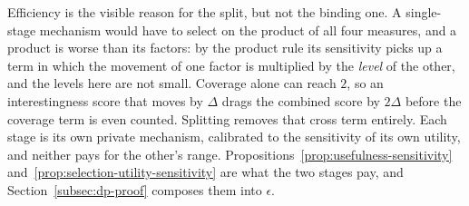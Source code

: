 Efficiency is the visible reason for the split, but not the binding one.
A single-stage mechanism would have to select on the product of all four measures, and a product is worse than its factors: by the product rule its sensitivity picks up a term in which the movement of one factor is multiplied by the \emph{level} of the other, and the levels here are not small.
Coverage alone can reach $2$, so an interestingness score that moves by $\Delta$ drags the combined score by $2\Delta$ before the coverage term is even counted.
Splitting removes that cross term entirely.
Each stage is its own private mechanism, calibrated to the sensitivity of its own utility, and neither pays for the other's range.
Propositions~\ref{prop:usefulness-sensitivity} and~\ref{prop:selection-utility-sensitivity} are what the two stages pay, and Section~\ref{subsec:dp-proof} composes them into $\epsilon$.
\begin{proposition}
\label{prop:usefulness-sensitivity}
\end{proposition}

